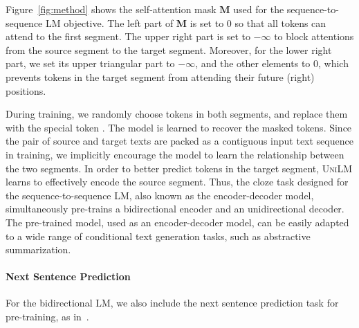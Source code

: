 \documentclass{article}
\newcommand\ours{\textsc{UniLM}}
\begin{document}
Figure~\ref{fig:method} shows the self-attention mask $\mathbf{M}$ used for the sequence-to-sequence LM objective. 
The left part of $\mathbf{M}$ is set to $0$ so that all tokens can attend to the first segment. The upper right part is set to $-\infty$ to block attentions from the source segment to the target segment. Moreover, for the lower right part, we set its upper triangular part to $-\infty$, and the other elements to $0$, which prevents tokens in the target segment from attending their future (right) positions.

During training, we randomly choose tokens in both segments, and replace them with the special token . The model is learned to recover the masked tokens.
Since the pair of source and target texts are packed as a  contiguous input text sequence in training, we implicitly encourage the model to learn the relationship between the two segments.
In order to better predict tokens in the target segment, \ours{} learns to effectively encode the source segment.
Thus, the cloze task designed for the sequence-to-sequence LM, also known as the encoder-decoder model, simultaneously pre-trains a bidirectional encoder and an unidirectional decoder.
The pre-trained model, used as an encoder-decoder model, can be easily adapted to a wide range of conditional text generation tasks, such as abstractive summarization.

\paragraph{Next Sentence Prediction}
\label{sec:nsp}

For the bidirectional LM, we also include the next sentence prediction task for pre-training, as in~\cite{bert}.

\end{document}

